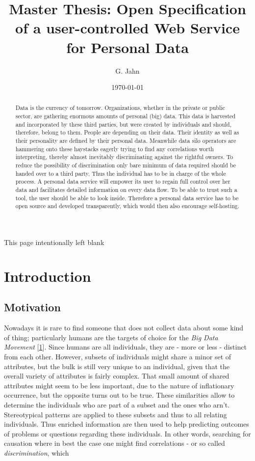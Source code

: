 \documentclass[12pt,english,a4paper,titlepage,cleardoublepage=empty,dottedtoc]{report}
\title{Master Thesis: Open Specification of a user-controlled Web Service for
Personal Data}
\author{G. Jahn}
\date{\today}
\begin{document}
\maketitle
\begin{abstract}
Data is the currency of tomorrow. Organizations, whether in the private
or public sector, are gathering enormous amounts of personal (big) data.
This data is harvested and incorporated by these third parties, but were
created by individuals and should, therefore, belong to them. People are
depending on their data. Their identity as well as their personality are
defined by their personal data. Meanwhile data silo operators are
hammering onto these haystacks eagerly trying to find any correlations
worth interpreting, thereby almost inevitably discriminating against the
rightful owners. To reduce the possibility of discrimination only bare
minimum of data required should be handed over to a third party. Thus
the individual has to be in charge of the whole process. A personal data
service will empower its user to regain full control over her data and
facilitates detailed information on every data flow. To be able to trust
such a tool, the user should be able to look inside. Therefore a
personal data service has to be open source and developed transparently,
which would then also encourage self-hosting.
\end{abstract}

{
\setcounter{tocdepth}{1}
\tableofcontents
}
This page intentionally left blank

\chapter{Introduction}\label{introduction}

\section{Motivation}\label{motivation}

Nowadays it is rare to find someone that does not collect data about
some kind of thing; particularly humans are the targets of choice for
the \emph{Big Data Movement}
{[}\protect\hyperlink{ref-web_2016_privacy-international-about-big-data}{1}{]}.
Since humans are all individuals, they are - more or less - distinct
from each other. However, subsets of individuals might share a minor set
of attributes, but the bulk is still very unique to an individual, given
that the overall variety of attributes is fairly complex. That small
amount of shared attributes might seem to be less important, due to the
nature of inflationary occurrence, but the opposite turns out to be
true. These similarities allow to determine the individuals who are part
of a subset and the ones who arn't. Stereotypical patterns are applied
to these subsets and thus to all relating individuals. Thus enriched
information are then used to help predicting outcomes of problems or
questions regarding these individuals. In other words, searching for
causation where in best the case one might find correlations - or so
called \emph{discrimination}, which
\end{document}
